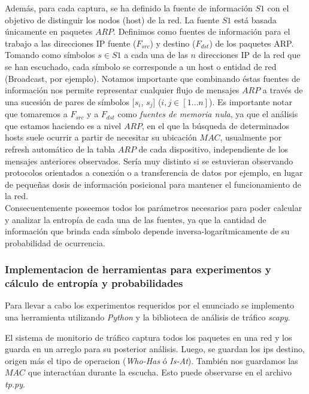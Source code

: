 Además, para cada captura, se ha definido la fuente de información $S1$ con el objetivo de distinguir los nodos (host) de la red. La fuente $S1$
está basada únicamente en paquetes $ARP$. Definimos como fuentes de información para el trabajo a las direcciones IP fuente ($F_{src}$) y destino ($F_{dst}$) de los paquetes ARP. 
Tomando como símbolos $s \in S1$ a cada una de las $n$ direcciones IP de la red que se han escuchado, cada símbolo se corresponde a un host o 
entidad de red (Broadcast, por ejemplo).
Notamos importante que combinando éstas fuentes de información nos permite representar cualquier flujo de mensajes $ARP$ a través de una sucesión
de pares de símbolos [$s_i$, $s_j$] ($i,j \in [1\ldots n]$).
Es importante notar que tomaremos a $F_{src}$ y a $F_{dst}$ como \emph{fuentes de memoria nula}, ya que el análisis que estamos haciendo es a 
nivel $ARP$, en el que la búsqueda de determinados hosts suele ocurrir a partir de necesitar su ubicación $MAC$, usualmente por refresh automático
de la tabla $ARP$ de cada dispositivo, independiente de los mensajes anteriores observados.
Sería muy distinto si se estuvieran observando protocolos orientados a conexión o a transferencia de datos por ejemplo, en lugar
de pequeñas dosis de información posicional para mantener el funcionamiento de la red.\\

Consecuentemente poseemos todos los parámetros necesarios para poder calcular y analizar la entropía de cada una de las fuentes,
ya que la cantidad de información que brinda cada símbolo depende inversa-logarítmicamente de su probabilidad de ocurrencia.\\

\subsubsection{Implementacion de herramientas para experimentos y cálculo de entropía y probabilidades}
Para llevar a cabo los experimentos requeridos por el enunciado se implemento una herramienta utilizando \emph{Python} y la biblioteca de 
análisis de tráfico \emph{scapy}.


El sistema de monitorio de tráfico captura todos los paquetes en una red y los guarda en un arreglo para su posterior análisis.
Luego, se guardan los ips destino, origen más el tipo de operacion (\emph{Who-Has} ó \emph{Is-At}). También nos guardamos las $MAC$ que interactúan
durante la escucha. Esto puede observarse en el archivo \emph{tp.py}.\\

